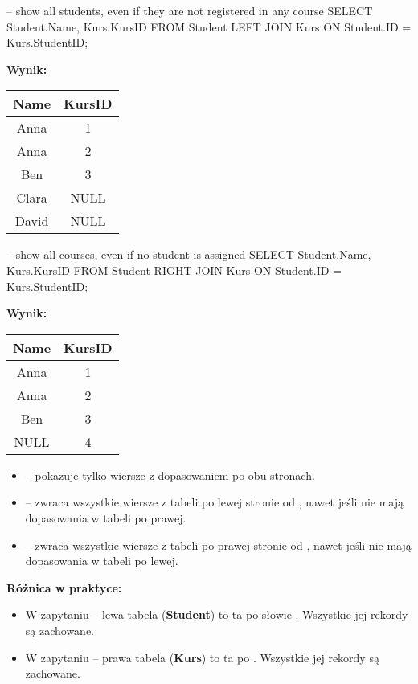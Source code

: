 \begin{sql}
-- show all students, even if they are not registered in any course
SELECT Student.Name, Kurs.KursID
    FROM Student
    LEFT JOIN Kurs ON Student.ID = Kurs.StudentID;
\end{sql}

\textbf{Wynik:}
\begin{center}
\begin{tabular}{|c|c|}
    \hline
    \textbf{Name} & \textbf{KursID} \\
    \hline
    Anna  & 1 \\
    Anna  & 2 \\
    Ben   & 3 \\
    Clara & NULL \\
    David & NULL \\
    \hline
\end{tabular}
\end{center}

\begin{sql}
-- show all courses, even if no student is assigned
SELECT Student.Name, Kurs.KursID
    FROM Student
    RIGHT JOIN Kurs ON Student.ID = Kurs.StudentID;
\end{sql}

\textbf{Wynik:}
\begin{center}
\begin{tabular}{|c|c|}
    \hline
    \textbf{Name} & \textbf{KursID} \\
    \hline
    Anna & 1 \\
    Anna & 2 \\
    Ben  & 3 \\
    NULL & 4 \\ %
    \hline
\end{tabular}
\end{center}

\begin{tcolorbox}[gray={Opis}]
\begin{itemize}
    \item {} – pokazuje tylko wiersze z dopasowaniem po obu stronach.
    \item {} – zwraca wszystkie wiersze z tabeli po lewej stronie od , nawet jeśli nie mają dopasowania w tabeli po prawej.
    \item {} – zwraca wszystkie wiersze z tabeli po prawej stronie od , nawet jeśli nie mają dopasowania w tabeli po lewej.
\end{itemize}
\end{tcolorbox}

\textbf{Różnica w praktyce:}
\begin{itemize}
    \item W zapytaniu  – lewa tabela (\textbf{Student}) to ta po słowie . Wszystkie jej rekordy są zachowane.
    \item W zapytaniu  – prawa tabela (\textbf{Kurs}) to ta po . Wszystkie jej rekordy są zachowane.
\end{itemize}
